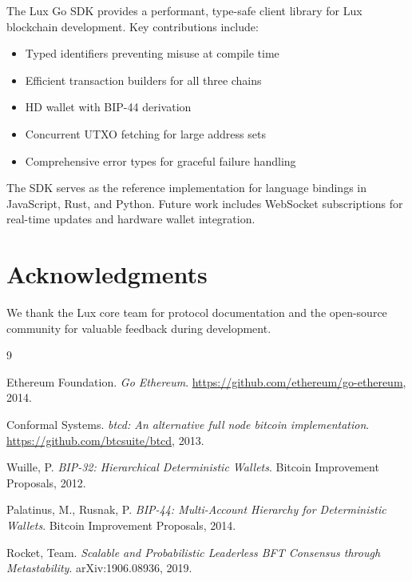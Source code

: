 \documentclass[11pt,twocolumn]{article}
\begin{document}
The Lux Go SDK provides a performant, type-safe client library for Lux blockchain development. Key contributions include:

\begin{itemize}
    \item Typed identifiers preventing misuse at compile time
    \item Efficient transaction builders for all three chains
    \item HD wallet with BIP-44 derivation
    \item Concurrent UTXO fetching for large address sets
    \item Comprehensive error types for graceful failure handling
\end{itemize}

The SDK serves as the reference implementation for language bindings in JavaScript, Rust, and Python. Future work includes WebSocket subscriptions for real-time updates and hardware wallet integration.

\section*{Acknowledgments}

We thank the Lux core team for protocol documentation and the open-source community for valuable feedback during development.

\begin{thebibliography}{9}

Ethereum Foundation.
\textit{Go Ethereum}.
\url{https://github.com/ethereum/go-ethereum}, 2014.

Conformal Systems.
\textit{btcd: An alternative full node bitcoin implementation}.
\url{https://github.com/btcsuite/btcd}, 2013.

Wuille, P.
\textit{BIP-32: Hierarchical Deterministic Wallets}.
Bitcoin Improvement Proposals, 2012.

Palatinus, M., Rusnak, P.
\textit{BIP-44: Multi-Account Hierarchy for Deterministic Wallets}.
Bitcoin Improvement Proposals, 2014.

Rocket, Team.
\textit{Scalable and Probabilistic Leaderless BFT Consensus through Metastability}.
arXiv:1906.08936, 2019.

\end{thebibliography}
\end{document}
